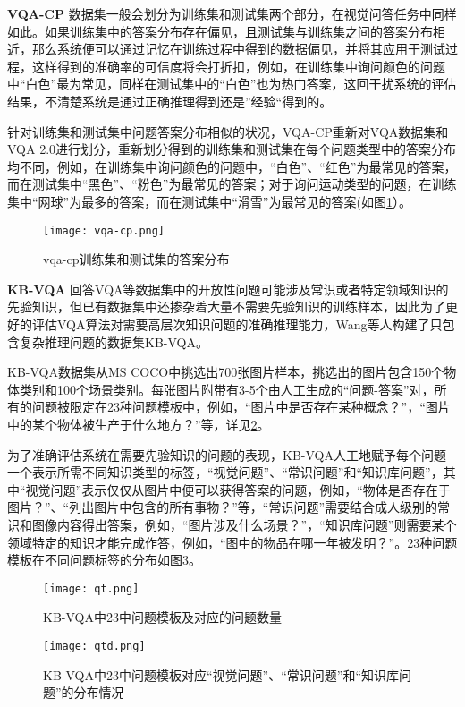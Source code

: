 \textbf{VQA-CP}
数据集一般会划分为训练集和测试集两个部分，在视觉问答任务中同样如此。如果训练集中的答案分布存在偏见，且测试集与训练集之间的答案分布相近，那么系统便可以通过记忆在训练过程中得到的数据偏见，并将其应用于测试过程，这样得到的准确率的可信度将会打折扣，例如，在训练集中询问颜色的问题中“白色”最为常见，同样在测试集中的“白色”也为热门答案，这回干扰系统的评估结果，不清楚系统是通过正确推理得到还是”经验“得到的。

针对训练集和测试集中问题答案分布相似的状况，VQA-CP重新对VQA数据集和VQA 2.0进行划分，重新划分得到的训练集和测试集在每个问题类型中的答案分布均不同，例如，在训练集中询问颜色的问题中，“白色”、“红色”为最常见的答案，而在测试集中“黑色”、“粉色”为最常见的答案；对于询问运动类型的问题，在训练集中“网球”为最多的答案，而在测试集中“滑雪”为最常见的答案(如图\ref{vqa-cp}）。
\begin{figure}[H]
	\centering
	\texttt{[image: vqa-cp.png]}
	\caption{vqa-cp训练集和测试集的答案分布}
	\label{vqa-cp}
\end{figure}

\textbf{KB-VQA}
回答VQA等数据集中的开放性问题可能涉及常识或者特定领域知识的先验知识，但已有数据集中还掺杂着大量不需要先验知识的训练样本，因此为了更好的评估VQA算法对需要高层次知识问题的准确推理能力，Wang等人构建了只包含复杂推理问题的数据集KB-VQA。

KB-VQA数据集从MS COCO中挑选出700张图片样本，挑选出的图片包含150个物体类别和100个场景类别。每张图片附带有3-5个由人工生成的“问题-答案”对，所有的问题被限定在23种问题模板中，例如，“图片中是否存在某种概念？”，“图片中的某个物体被生产于什么地方？”等，详见\ref{qt}。

为了准确评估系统在需要先验知识的问题的表现，KB-VQA人工地赋予每个问题一个表示所需不同知识类型的标签，“视觉问题”、“常识问题”和“知识库问题”，其中“视觉问题”表示仅仅从图片中便可以获得答案的问题，例如，“物体是否存在于图片？”、“列出图片中包含的所有事物？”等，“常识问题”需要结合成人级别的常识和图像内容得出答案，例如，“图片涉及什么场景？”，“知识库问题”则需要某个领域特定的知识才能完成作答，例如，“图中的物品在哪一年被发明？”。23种问题模板在不同问题标签的分布如图\ref{qtd}。
\begin{figure}[H]
	\centering
	\texttt{[image: qt.png]}
	\caption{KB-VQA中23中问题模板及对应的问题数量}
	\label{qt}
\end{figure}
\begin{figure}[H]
	\centering
	\texttt{[image: qtd.png]}
	\caption{KB-VQA中23中问题模板对应“视觉问题”、“常识问题”和“知识库问题”的分布情况}
	\label{qtd}
\end{figure}

